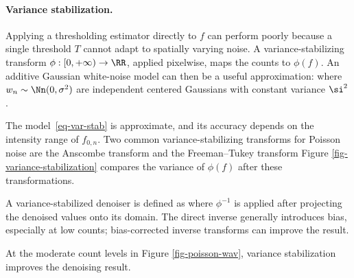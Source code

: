  
\paragraph{Variance stabilization.}

Applying a thresholding estimator
directly to $f$ can perform poorly because a single threshold $T$ cannot adapt to spatially varying noise. A variance-stabilizing transform $\phi : [0,+\infty) \rightarrow \RR$, applied pixelwise, maps the counts to $\phi(f)$. An additive Gaussian white-noise model can then be a useful approximation:
where $w_n\sim\Nn(0,\sigma^2)$ are independent centered Gaussians with constant variance $\si^2$.

The model~\eqref{eq-var-stab} is approximate, and its accuracy depends on the intensity range of $f_{0,n}$.
Two common variance-stabilizing transforms for Poisson noise are the Anscombe transform
and the Freeman--Tukey transform
Figure \ref{fig-variance-stabilization} compares the variance of $\phi(f)$ after these transformations.


A variance-stabilized denoiser is defined as
where $\phi^{-1}$ is applied after projecting the denoised values onto its domain. The direct inverse generally introduces bias, especially at low counts; bias-corrected inverse transforms can improve the result.

At the moderate count levels in Figure \ref{fig-poisson-wav}, variance stabilization improves the denoising result.


                